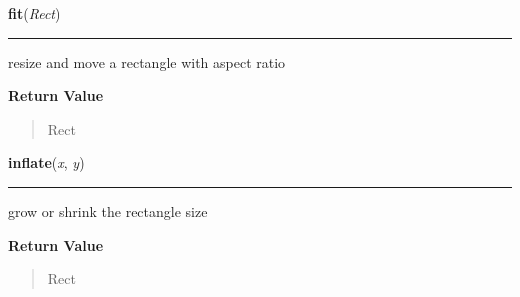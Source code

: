     \label{pygame:Rect:fit}

    \vspace{0.5ex}

\hspace{.8\funcindent}\begin{boxedminipage}{\funcwidth}

    \raggedright \textbf{fit}(\textit{Rect})

    \vspace{-1.5ex}

    \rule{\textwidth}{0.5\fboxrule}
\setlength{\parskip}{2ex}
    resize and move a rectangle with aspect ratio

\setlength{\parskip}{1ex}
      \textbf{Return Value}
    \vspace{-1ex}

      \begin{quote}
      Rect

      \end{quote}

    \end{boxedminipage}

    \label{pygame:Rect:inflate}

    \vspace{0.5ex}

\hspace{.8\funcindent}\begin{boxedminipage}{\funcwidth}

    \raggedright \textbf{inflate}(\textit{x}, \textit{y})

    \vspace{-1.5ex}

    \rule{\textwidth}{0.5\fboxrule}
\setlength{\parskip}{2ex}
    grow or shrink the rectangle size

\setlength{\parskip}{1ex}
      \textbf{Return Value}
    \vspace{-1ex}

      \begin{quote}
      Rect

      \end{quote}

    \end{boxedminipage}

    \label{pygame:Rect:inflate_ip}

    \vspace{0.5ex}

